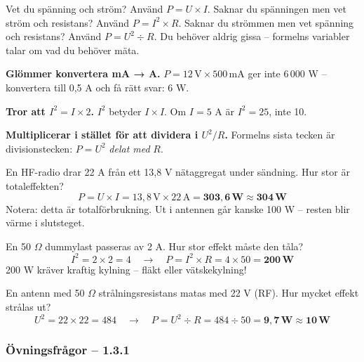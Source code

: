 \documentclass[a4paper,11pt,twoside]{book}
\newcommand{\emoji}[1]{{\emojifont #1}}
\begin{document}
\begin{examplebox}[title={\emoji{💡} Välj rätt formel – en enkel tumregel}]
Vet du spänning och ström? Använd $P = U \times I$. Saknar du spänningen men vet ström och resistans? Använd $P = I^2 \times R$. Saknar du strömmen men vet spänning och resistans? Använd $P = U^2 \div R$. Du behöver aldrig gissa – formelns variabler talar om vad du behöver mäta.
\end{examplebox}

\begin{redbox}[title={\emoji{⚠️} De tre vanligaste misstagen}]
\textbf{Glömmer konvertera mA → A.} $P = 12\,\text{V} \times 500\,\text{mA}$ ger inte 6\,000 W – konvertera till 0,5 A och få rätt svar: 6 W.

\textbf{Tror att $I^2 = I \times 2$.} $I^2$ betyder $I \times I$. Om $I = 5$ A är $I^2 = 25$, inte 10.

\textbf{Multiplicerar i stället för att dividera i $U^2/R$.} Formelns sista tecken är divisionstecken: $P = U^2$ \emph{delat med} $R$.
\end{redbox}

\begin{worked}[title={Räkneexempel 1.3.1-1 – HF-transceiver}]
En HF-radio drar 22 A från ett 13,8 V nätaggregat under sändning. Hur stor är totaleffekten?
\[ P = U \times I = 13{,}8\,\text{V} \times 22\,\text{A} = \mathbf{303{,}6\,\text{W} \approx 304\,\text{W}} \]
Notera: detta är totalförbrukning. Ut i antennen går kanske 100 W – resten blir värme i slutsteget.
\end{worked}

\begin{worked}[title={Räkneexempel 1.3.1-2 – Dummylast}]
En 50 $\Omega$ dummylast passeras av 2 A. Hur stor effekt måste den tåla?
\[ I^2 = 2 \times 2 = 4 \quad\rightarrow\quad P = I^2 \times R = 4 \times 50 = \mathbf{200\,\text{W}} \]
200 W kräver kraftig kylning – fläkt eller vätskekylning!
\end{worked}

\begin{worked}[title={Räkneexempel 1.3.1-3 – Antennresistans}]
En antenn med 50 $\Omega$ strålningsresistans matas med 22 V (RF). Hur mycket effekt strålas ut?
\[ U^2 = 22 \times 22 = 484 \quad\rightarrow\quad P = U^2 \div R = 484 \div 50 = \mathbf{9{,}7\,\text{W} \approx 10\,\text{W}} \]
\end{worked}

\subsubsection*{Övningsfrågor – 1.3.1}
\end{document}
